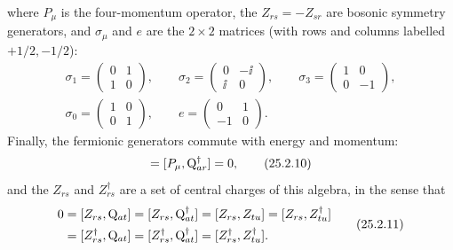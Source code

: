 where \(P_\mu\) is the four-momentum operator, the
\(Z_{rs}=-Z_{sr}\) are bosonic symmetry generators, and \(\sigma_\mu\)
and \(e\) are the \(2\times2\) matrices (with rows and columns labelled
\(+1/2,-1/2\)):
\begin{equation}
\begin{gathered}
\sigma_1=
\begin{pmatrix}0&1\\1&0\end{pmatrix},
\qquad
\sigma_2=
\begin{pmatrix}0&-\ii\\\ii&0\end{pmatrix},
\qquad
\sigma_3=
\begin{pmatrix}1&0\\0&-1\end{pmatrix},
\\
\sigma_0=
\begin{pmatrix}1&0\\0&1\end{pmatrix},
\qquad
e=
\begin{pmatrix}0&1\\-1&0\end{pmatrix}.
\end{gathered}
\tag{25.2.9}\label{eq:25.2.9}
\end{equation}
Finally, the fermionic generators commute with energy and momentum:
\begin{equation}
[P_\mu,\WeylQ_{ar}]=[P_\mu,\WeylQ_{ar}^\dagger]=0,
\tag{25.2.10}\label{eq:25.2.10}
\end{equation}
and the \(Z_{rs}\) and \(Z_{rs}^\dagger\) are a set of central charges of this
algebra, in the sense that
\begin{equation}
\begin{aligned}
0
&=[Z_{rs},\mathrm{Q}_{at}]
=[Z_{rs},\mathrm{Q}_{at}^\dagger]
=[Z_{rs},Z_{tu}]
=[Z_{rs},Z_{tu}^\dagger]
\\
&=[Z_{rs}^\dagger,\mathrm{Q}_{at}]
=[Z_{rs}^\dagger,\mathrm{Q}_{at}^\dagger]
=[Z_{rs}^\dagger,Z_{tu}^\dagger].
\end{aligned}
\tag{25.2.11}\label{eq:25.2.11}
\end{equation}


